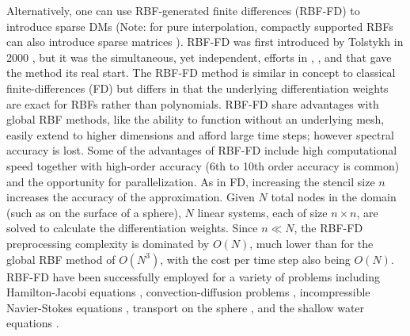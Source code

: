 Alternatively, one can use RBF-generated finite differences (RBF-FD) to introduce sparse DMs (Note: for pure interpolation, compactly supported RBFs can also introduce sparse matrices \cite{Wendland1995}).
RBF-FD was first introduced by Tolstykh in 2000 \cite{Tolstykh2000}, 
but it was the simultaneous, yet independent,
efforts in \cite{Shu2003}, \cite{Tolstykh2003a}, \cite{Wright2003} and \cite{Cecil2004} that gave the method its real start. 
The RBF-FD method is similar in concept to classical 
finite-differences (FD) but differs in that the underlying differentiation 
weights are exact for RBFs rather than polynomials. RBF-FD 
share advantages with global RBF methods, 
like the ability to function without an underlying mesh, easily extend to higher dimensions and afford large time steps; however spectral accuracy is lost. 
Some of the advantages of RBF-FD 
include high computational speed together with high-order accuracy
(6th to 10th order accuracy is common) and the opportunity 
for parallelization.
As in FD, increasing the stencil size $n$  increases the accuracy of the approximation.
Given $N$ total nodes in the domain (such as on the surface of a sphere), $N$ linear systems, each of size $n \times n$, are solved to calculate the differentiation weights. Since $n \ll N$, the RBF-FD preprocessing complexity is dominated by $O(N)$, much lower than for the global RBF method of $O(N^3)$, with the cost per time step also being $O(N)$. RBF-FD have been successfully employed for a variety of problems including Hamilton-Jacobi equations \cite{Cecil2004}, convection-diffusion problems \cite{Chandhini2007, Stevens2009b},
incompressible Navier-Stokes equations \cite{Shu2003,Chinchapatnam2009}, transport on the sphere \cite{FornbergLehto11}, and the shallow water equations \cite{FlyerLehto11}.

